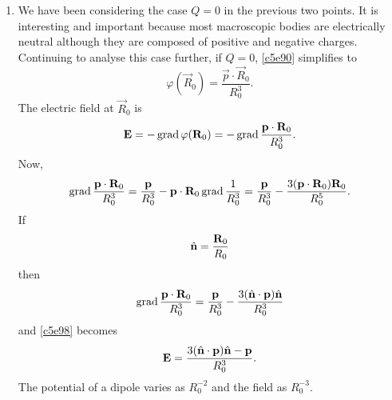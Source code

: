 \begin{enumerate}
\item We have been considering the case $Q = 0$ in the previous two points. It is
interesting and important because most macroscopic bodies are electrically neutral
although they are composed of positive and negative charges. Continuing to analyse
this case further, if $Q = 0$, \eqref{c5e90} simplifies to
\begin{equation}\label{c5e97}
\varphi(\vec{R}_0) = \frac{\vec{p}\cdot\vec{R}_0}{R_0^3}.
\end{equation}
The electric field at $\vec{R}_0$ is
\begin{equation}\label{c5e98}
\mathbf{E} = -\operatorname{grad}\varphi(\mathbf{R}_0) = -\operatorname{grad}\frac{\mathbf{p}\cdot\mathbf{R}_0}{R_0^3}.
\end{equation}
Now,
\[
\operatorname{grad}\frac{\mathbf{p}\cdot\mathbf{R}_0}{R_0^3} = \frac{\mathbf{p}}{R_0^3} - 
\mathbf{p}\cdot\mathbf{R}_0\operatorname{grad}\frac{1}{R_0^3} = \frac{\mathbf{p}}{R_0^3} -
\frac{3(\mathbf{p}\cdot\mathbf{R}_0)\mathbf{R}_0}{R_0^5}.
\]
If 
\begin{equation}\label{c5e99}
\hat{\mathbf{n}} = \frac{\mathbf{R}_0}{R_0}
\end{equation}
then
\begin{equation}\label{c5e100}
\operatorname{grad}\frac{\mathbf{p}\cdot\mathbf{R}_0}{R_0^3} = 
\frac{\mathbf{p}}{R_0^3} - \frac{3(\hat{\mathbf{n}}\cdot\mathbf{p})\hat{\mathbf{n}}}{R_0^3}
\end{equation}
and \eqref{c5e98} becomes
\begin{equation}\label{c5e101}
\mathbf{E} = \frac{3(\hat{\mathbf{n}}\cdot\mathbf{p})\hat{\mathbf{n}} - \mathbf{p}}{R_0^3}.
\end{equation}
The potential of a dipole varies as $R_0^{-2}$ and the field as $R_0^{-3}$.


\end{enumerate}
